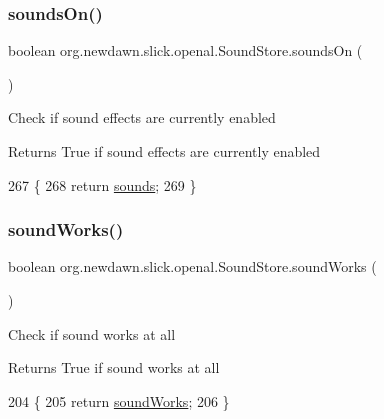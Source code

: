 \subsubsection{\texorpdfstring{sounds\+On()}{soundsOn()}}
{\footnotesize\ttfamily boolean org.\+newdawn.\+slick.\+openal.\+Sound\+Store.\+sounds\+On (\begin{DoxyParamCaption}{ }\end{DoxyParamCaption})\hspace{0.3cm}{\ttfamily [inline]}}

Check if sound effects are currently enabled

\begin{DoxyReturn}{Returns}
True if sound effects are currently enabled 
\end{DoxyReturn}

\begin{DoxyCode}
267                               \{
268         \textcolor{keywordflow}{return} \mbox{\hyperlink{classorg_1_1newdawn_1_1slick_1_1openal_1_1_sound_store_a64f1d8fb16c0b816d20abf0e695a85ec}{sounds}};
269     \}
\end{DoxyCode}
\mbox{\label{classorg_1_1newdawn_1_1slick_1_1openal_1_1_sound_store_ae563e9c1a01e333dc2350f1450f451fd}} 
\subsubsection{\texorpdfstring{sound\+Works()}{soundWorks()}}
{\footnotesize\ttfamily boolean org.\+newdawn.\+slick.\+openal.\+Sound\+Store.\+sound\+Works (\begin{DoxyParamCaption}{ }\end{DoxyParamCaption})\hspace{0.3cm}{\ttfamily [inline]}}

Check if sound works at all

\begin{DoxyReturn}{Returns}
True if sound works at all 
\end{DoxyReturn}

\begin{DoxyCode}
204                                 \{
205         \textcolor{keywordflow}{return} \mbox{\hyperlink{classorg_1_1newdawn_1_1slick_1_1openal_1_1_sound_store_ae563e9c1a01e333dc2350f1450f451fd}{soundWorks}};
206     \}
\end{DoxyCode}
\mbox{\label{classorg_1_1newdawn_1_1slick_1_1openal_1_1_sound_store_a2da588724af2aac64706304f863b5634}} 
